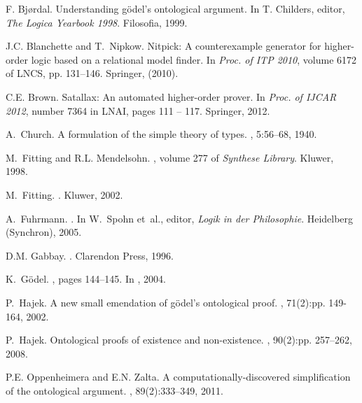 \documentclass{llncs}
\begin{document}
\begin{thebibliography}{10}
F. Bjørdal.
\newblock Understanding gödel’s ontological argument.
\newblock In T. Childers, editor, {\em The Logica Yearbook 1998}.
  Filosofia, 1999.

J.C. Blanchette and T.~Nipkow.
\newblock Nitpick: A counterexample generator for
  higher-order logic based on a relational model finder. In {\em Proc. of ITP
  2010}, volume 6172 of LNCS, pp. 131--146. Springer, (2010).

C.E. Brown.
\newblock Satallax: An automated higher-order prover.
\newblock In {\em Proc. of IJCAR 2012}, number 7364 in LNAI, pages 111 -- 117.
  Springer, 2012.


A.~Church.
\newblock A formulation of the simple theory of types.
, 5:56--68, 1940.

M.~Fitting and R.L. Mendelsohn.
, volume 277 of {\em Synthese Library}.
\newblock Kluwer, 1998.

M.~Fitting.
.
\newblock Kluwer, 2002.

A.~Fuhrmann.
.
\newblock In W.~Spohn et~al., editor, {\em Logik in der Philosophie}.
  Heidelberg (Synchron), 2005.

D.M. Gabbay.
.
\newblock Clarendon Press, 1996.

K.~G\"odel.
, pages 144--145.
\newblock In  \cite{sobel2004logic}, 2004.

P.~Hajek.
\newblock A new small emendation of g\"odel's ontological proof.
,
  71(2):pp. 149-164, 2002.

P.~Hajek.
\newblock Ontological proofs of existence and non-existence.
,
  90(2):pp. 257--262, 2008.

P.E. Oppenheimera and E.N. Zalta.
\newblock A computationally-discovered simplification of the ontological
  argument.
, 89(2):333--349, 2011.


\end{thebibliography}
\end{document}
